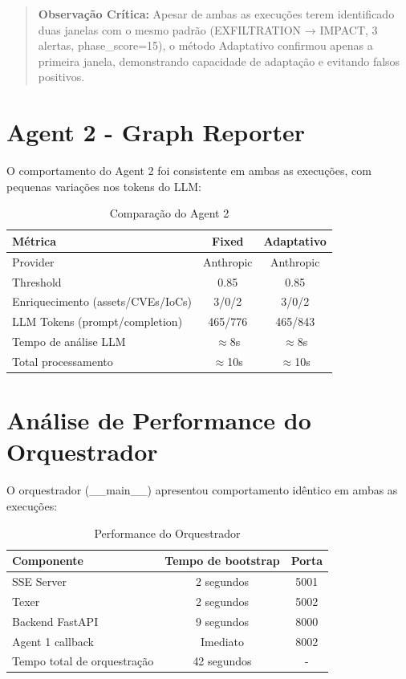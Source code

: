 \documentclass[10pt,a4paper]{article}
\begin{document}
\begin{quote}
\color{blue}
\textbf{Observação Crítica:} Apesar de ambas as execuções terem identificado duas janelas com o mesmo padrão (EXFILTRATION → IMPACT, 3 alertas, phase\_score=15), o método Adaptativo confirmou apenas a primeira janela, demonstrando capacidade de adaptação e evitando falsos positivos.
\end{quote}

\section{Agent 2 - Graph Reporter}

O comportamento do Agent 2 foi consistente em ambas as execuções, com pequenas variações nos tokens do LLM:

\begin{table}[h]
\centering
\caption{Comparação do Agent 2}
\begin{tabular}{@{}lcc@{}}
\toprule
\textbf{Métrica} & \textbf{Fixed} & \textbf{Adaptativo} \\
\midrule
Provider & Anthropic & Anthropic \\
Threshold & 0.85 & 0.85 \\
Enriquecimento (assets/CVEs/IoCs) & 3/0/2 & 3/0/2 \\
LLM Tokens (prompt/completion) & 465/776 & 465/843 \\
Tempo de análise LLM & $\approx$8s & $\approx$8s \\
Total processamento & $\approx$10s & $\approx$10s \\
\bottomrule
\end{tabular}
\end{table}

\section{Análise de Performance do Orquestrador}

O orquestrador (\_\_main\_\_) apresentou comportamento idêntico em ambas as execuções:

\begin{table}[h]
\centering
\caption{Performance do Orquestrador}
\begin{tabular}{@{}lcc@{}}
\toprule
\textbf{Componente} & \textbf{Tempo de bootstrap} & \textbf{Porta} \\
\midrule
SSE Server & 2 segundos & 5001 \\
Texer & 2 segundos & 5002 \\
Backend FastAPI & 9 segundos & 8000 \\
Agent 1 callback & Imediato & 8002 \\
Tempo total de orquestração & 42 segundos & - \\
\bottomrule
\end{tabular}
\end{table}
\end{document}
